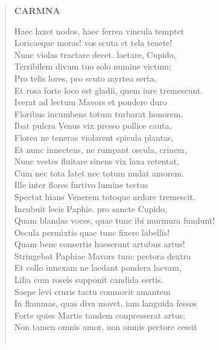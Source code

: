 \documentclass[11pt, a4paper]{report}
\begin{document}
\begin{verse}
    \begin{center} \textbf{CARMNA} \end{center} \marginpar{[206]} Haec laxet nodos, haec ferrea vincula temptet \\ Loricaeque moras! vos scuta et tela tenete! \\ Nunc violas tractare decet. laetare, Cupido, \\ Terribilem divum tuo solo numine victum: \\ Pro telis lores, pro scuto myrtea serta, \\ Et rosa forte loco est gladii, quem iure tremescunt. \\ Iverat ad lectum Mavors et pondere duro \\ Floribus incumbens totum turbarat honorem. \\ Ibat pulcra Venus vix presso pollice cauta, \\ Florea ne teneras violarent spicula plantas, \\ Et nunc innectens, ne rumpant oscula, crinem, \\ Nunc vestes fluitare sinens vix laxa retentat, \\ Cum nec tota latet nec totum nudat amorem. \\ Ille inter flores furtivo lumine tectus \\ Spectat hians Venerem totoque ardore tremescit. \\ Incubuit lecis Paphie. pro sancte Cupido, \\ Quam blandas voces, quae tunc ibi murmura fundunt! \\ Oscula permixtis quae tunc fixere labellis! \\ Quam bene consertis haeserunt artubus artus! \\ Stringebat Paphiae Mavors tunc pectora dextra \\ Et collo innexam ne laedant pondera laevam, \\ Lilia cum roseis supponit candida sertis. \\ Saepe levi cruris tactu conmovit amantem \\ In flammas, quas diva movet. iam languida fessos \\ Forte quies Martis tandem conpresserat artus; \\ Non tamen omnis amor, non omnis pectore cessit \\ 
        ﻿\pagebreak 

\end{verse}
\end{document}
